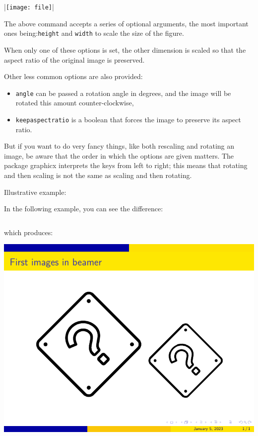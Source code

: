 |\texttt{[image: file]}|

The above command accepts a series of optional arguments, the most important ones being:\verb|height| and \verb|width| to scale the size of the figure.

When only one of these options is set, the other dimension is scaled so that the aspect ratio of the original image is preserved.

Other less common options are also provided:

\begin{itemize}
  \item \verb|angle| can be passed a rotation angle in degrees, and the image will be rotated this amount counter-clockwise,
  \item \verb|keepaspectratio| is a boolean that forces the image to preserve its aspect ratio.
\end{itemize}

But if you want to do very fancy things, like both rescaling and rotating an image, be aware that the order in which the options are given matters. The package graphicx interprets the keys from left to right; this means that rotating and then scaling is not the same as scaling and then rotating.

Illustrative example:

In the following example, you can see the difference:

\inputminted[linenos=true]{latex}{examples/beamer/beamerfigure01.tex}

which produces:

\includegraphics{examples/beamer/beamerfigure01.pdf}

